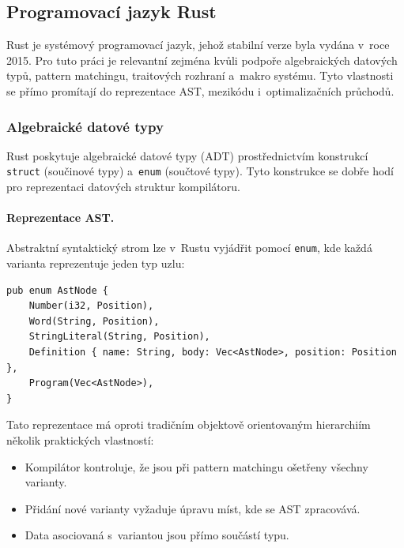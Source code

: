 
\subsection{Programovací jazyk Rust}
\label{sec:rust}

Rust je systémový programovací jazyk, jehož stabilní verze byla vydána
v~roce 2015. Pro tuto práci je relevantní zejména kvůli podpoře algebraických
datových typů, pattern matchingu, traitových rozhraní a~makro systému.
Tyto vlastnosti se přímo promítají do reprezentace AST, mezikódu
i~optimalizačních průchodů.


\subsubsection{Algebraické datové typy}
\label{sec:rust-adt}

Rust poskytuje algebraické datové typy (ADT) prostřednictvím konstrukcí
\texttt{struct} (součinové typy) a~\texttt{enum} (součtové typy). Tyto
konstrukce se dobře hodí pro reprezentaci datových struktur kompilátoru.

\paragraph{Reprezentace AST.}
Abstraktní syntaktický strom lze v~Rustu vyjádřit pomocí \texttt{enum},
kde každá varianta reprezentuje jeden typ uzlu:

\begin{lstlisting}[basicstyle=\small\ttfamily]
pub enum AstNode {
    Number(i32, Position),
    Word(String, Position),
    StringLiteral(String, Position),
    Definition { name: String, body: Vec<AstNode>, position: Position },
    Program(Vec<AstNode>),
}
\end{lstlisting}

Tato reprezentace má oproti tradičním objektově orientovaným hierarchiím
několik praktických vlastností:
\begin{itemize}
	\item Kompilátor kontroluje, že jsou při pattern matchingu ošetřeny
	      všechny varianty.
	\item Přidání nové varianty vyžaduje úpravu míst, kde se AST zpracovává.
	\item Data asociovaná s~variantou jsou přímo součástí typu.
\end{itemize}

